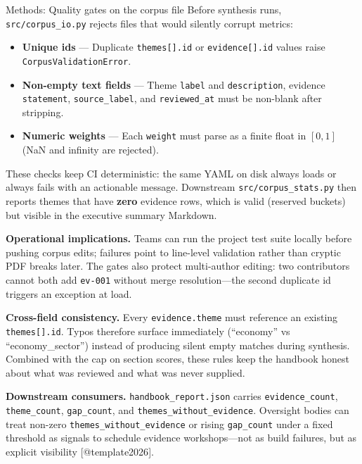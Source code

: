 \documentclass[
  ignorenonframetext,
]{beamer}
\author{\texorpdfstring{}{}}
\date{}
\providecommand{\tightlist}{%
  \setlength{\itemsep}{0pt}\setlength{\parskip}{0pt}}
\begin{document}
\begin{frame}[fragile]{Methods: Quality gates on the corpus file}
\protect{}\label{methods-quality-gates-on-the-corpus-file}
Before synthesis runs, \texttt{src/corpus\_io.py} rejects files that
would silently corrupt metrics:

\begin{itemize}
\tightlist
\item
  \textbf{Unique ids} --- Duplicate \texttt{themes{[}{]}.id} or
  \texttt{evidence{[}{]}.id} values raise
  \texttt{CorpusValidationError}.
\item
  \textbf{Non-empty text fields} --- Theme \texttt{label} and
  \texttt{description}, evidence \texttt{statement},
  \texttt{source\_label}, and \texttt{reviewed\_at} must be non-blank
  after stripping.
\item
  \textbf{Numeric weights} --- Each \texttt{weight} must parse as a
  finite float in \([0, 1]\) (NaN and infinity are rejected).
\end{itemize}

These checks keep CI deterministic: the same YAML on disk always loads
or always fails with an actionable message. Downstream
\texttt{src/corpus\_stats.py} then reports themes that have
\textbf{zero} evidence rows, which is valid (reserved buckets) but
visible in the executive summary Markdown.

\textbf{Operational implications.} Teams can run the project test suite
locally before pushing corpus edits; failures point to line-level
validation rather than cryptic PDF breaks later. The gates also protect
multi-author editing: two contributors cannot both add \texttt{ev-001}
without merge resolution---the second duplicate id triggers an exception
at load.

\textbf{Cross-field consistency.} Every \texttt{evidence.theme} must
reference an existing \texttt{themes{[}{]}.id}. Typos therefore surface
immediately (``economy'' vs ``economy\_sector'') instead of producing
silent empty matches during synthesis. Combined with the cap on section
scores, these rules keep the handbook honest about what was reviewed and
what was never supplied.

\textbf{Downstream consumers.} \texttt{handbook\_report.json} carries
\texttt{evidence\_count}, \texttt{theme\_count}, \texttt{gap\_count},
and \texttt{themes\_without\_evidence}. Oversight bodies can treat
non-zero \texttt{themes\_without\_evidence} or rising
\texttt{gap\_count} under a fixed threshold as signals to schedule
evidence workshops---not as build failures, but as explicit visibility
{[}@template2026{]}.
\end{frame}
\end{document}

